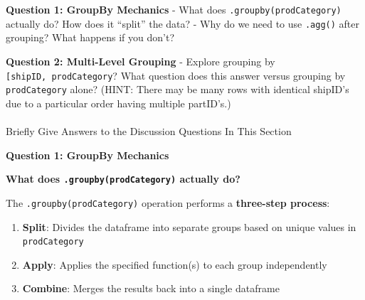 \documentclass[
  letterpaper,
  DIV=11,
  numbers=noendperiod]{scrartcl}
\makeatletter
\let\oldparagraph\paragraph
\renewcommand{\paragraph}{
    \@ifstar
      \xxxParagraphStar
      \xxxParagraphNoStar
  }
\newcommand{\xxxParagraphStar}[1]{\oldparagraph*{#1}\mbox{}}
\newcommand{\xxxParagraphNoStar}[1]{\oldparagraph{#1}\mbox{}}
\providecommand{\tightlist}{%
  \setlength{\itemsep}{0pt}\setlength{\parskip}{0pt}}
\makeatother
\begin{document}
\begin{tcolorbox}[enhanced jigsaw, bottomtitle=1mm, opacitybacktitle=0.6, toptitle=1mm, colbacktitle=quarto-callout-important-color!10!white, breakable, coltitle=black, bottomrule=.15mm, left=2mm, colframe=quarto-callout-important-color-frame, colback=white, title=\textcolor{quarto-callout-important-color}{\faExclamation}\hspace{0.5em}{🤔 Discussion Questions: Split-Apply-Combine Mental Model}, leftrule=.75mm, arc=.35mm, rightrule=.15mm, opacityback=0, toprule=.15mm, titlerule=0mm]

\textbf{Question 1: GroupBy Mechanics} - What does
\texttt{.groupby(\textquotesingle{}prodCategory\textquotesingle{})}
actually do? How does it ``split'' the data? - Why do we need to use
\texttt{.agg()} after grouping? What happens if you don't?

\textbf{Question 2: Multi-Level Grouping} - Explore grouping by
\texttt{{[}\textquotesingle{}shipID\textquotesingle{},\ \textquotesingle{}prodCategory\textquotesingle{}{]}}?
What question does this answer versus grouping by
\texttt{\textquotesingle{}prodCategory\textquotesingle{}} alone? (HINT:
There may be many rows with identical shipID's due to a particular order
having multiple partID's.)

\end{tcolorbox}

\paragraph{Briefly Give Answers to the Discussion Questions In This
Section}\label{briefly-give-answers-to-the-discussion-questions-in-this-section-6}

\textbf{Question 1: GroupBy Mechanics}

\textbf{What does
\texttt{.groupby(\textquotesingle{}prodCategory\textquotesingle{})}
actually do?}

The \texttt{.groupby(\textquotesingle{}prodCategory\textquotesingle{})}
operation performs a \textbf{three-step process}:

\begin{enumerate}
\def\labelenumi{\arabic{enumi}.}
\tightlist
\item
  \textbf{Split}: Divides the dataframe into separate groups based on
  unique values in \texttt{prodCategory}
\item
  \textbf{Apply}: Applies the specified function(s) to each group
  independently\\
\item
  \textbf{Combine}: Merges the results back into a single dataframe
\end{enumerate}
\end{document}
